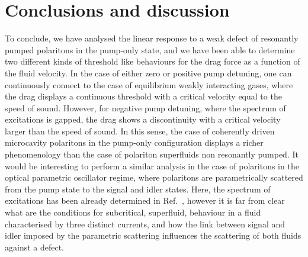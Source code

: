 \section{Conclusions and discussion}
\label{sec:concl}
%
To conclude, we have analysed the linear response to a weak defect of
resonantly pumped polaritons in the pump-only state, and we have been
able to determine two different kinds of threshold like behaviours for
the drag force as a function of the fluid velocity. In the case of
either zero or positive pump detuning, one can continuously connect to
the case of equilibrium weakly interacting gases, where the drag
displays a continuous threshold with a critical velocity equal to the
speed of sound. However, for negative pump detuning, where the
spectrum of excitations is gapped, the drag shows a discontinuity with
a critical velocity larger than the speed of sound. In this sense, the
case of coherently driven microcavity polaritons in the pump-only
configuration displays a richer phenomenology than the case of
polariton superfluids non resonantly pumped. It would be interesting
to perform a similar analysis in the case of polaritons in the optical
parametric oscillator regime, where polaritons are parametrically
scattered from the pump state to the signal and idler states. Here,
the spectrum of excitations has been already determined in
Ref.~\cite{Wouters_2007}, however it is far from clear what are the
conditions for subcritical, superfluid, behaviour in a fluid
characterised by three distinct currents, and how the link between
signal and idler imposed by the parametric scattering influences the
scattering of both fluids against a defect.


